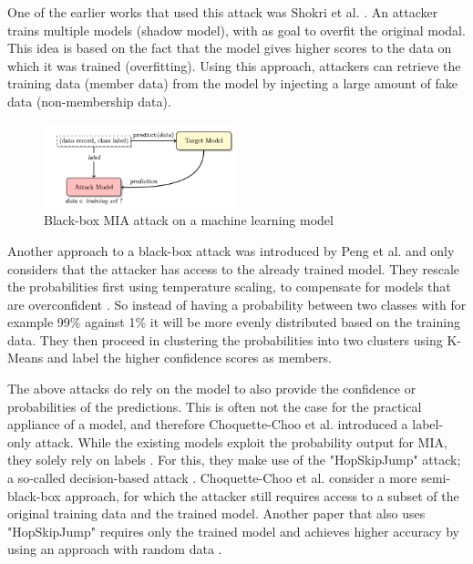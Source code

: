 One of the earlier works that used this attack was Shokri et al. \citep{shokri_membership_2017}.
An attacker trains multiple models (shadow model), with as goal to overfit the original modal.
This idea is based on the fact that the model gives higher scores to the data on which it was trained (overfitting).
Using this approach, attackers can retrieve the training data (member data) from the model by injecting a large amount of fake data (non-membership data).
\begin{figure}[H]
  \includegraphics[width=0.5\textwidth]{TheorethicalFramework/AttacksOnPrivacy/shadow-models-mi.png}
  \caption{Black-box MIA attack on a machine learning model \citep{shokri_membership_2017}}
\end{figure}
Another approach to a black-box attack was introduced by Peng et al. and only considers that the attacker has access to the already trained model.
They rescale the probabilities first using temperature scaling, to compensate for models that are overconfident \citep{peng_unsupervised_nodate}.
So instead of having a probability between two classes with for example 99\% against 1\% it will be more evenly distributed based on the training data.
They then proceed in clustering the probabilities into two clusters using K-Means and label the higher confidence scores as members.

The above attacks do rely on the model to also provide the confidence or probabilities of the predictions.
This is often not the case for the practical appliance of a model, and therefore Choquette-Choo et al. introduced a label-only attack.
While the existing models exploit the probability output for MIA, they solely rely on labels \citep{choquette-choo_label-only_2021}.
For this, they make use of the "HopSkipJump" attack; a so-called decision-based attack \citep{chen_hopskipjumpattack_2020}.
Choquette-Choo et al. consider a more semi-black-box approach, for which the attacker still requires access to a subset of the original training data and the trained model.
Another paper that also uses "HopSkipJump" requires only the trained model and achieves higher accuracy by using an approach with random data \citep{li_membership_2021}. \newline


